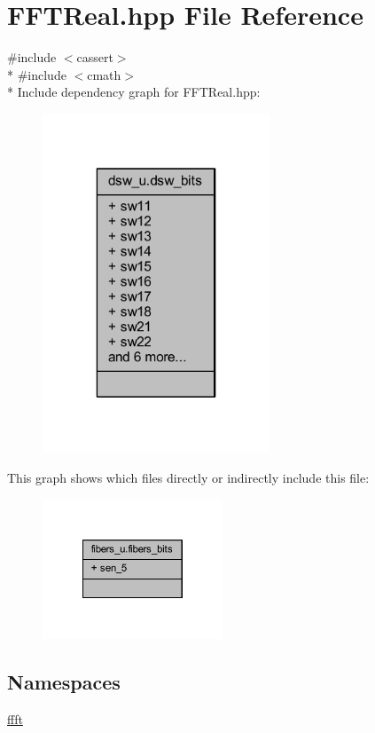 \hypertarget{a00096}{\section{F\+F\+T\+Real.\+hpp File Reference}
\label{a00096}
}
{\ttfamily \#include $<$cassert$>$}\\*
{\ttfamily \#include $<$cmath$>$}\\*
Include dependency graph for F\+F\+T\+Real.\+hpp\+:
\nopagebreak
\begin{figure}[H]
\begin{center}
\leavevmode
\includegraphics[width=192pt]{d9/d39/a00257}
\end{center}
\end{figure}
This graph shows which files directly or indirectly include this file\+:
\nopagebreak
\begin{figure}[H]
\begin{center}
\leavevmode
\includegraphics[width=152pt]{d7/d2f/a00258}
\end{center}
\end{figure}
\subsection*{Namespaces}
\begin{DoxyCompactItemize}
\item 
 \hyperlink{a00142}{ffft}
\end{DoxyCompactItemize}
